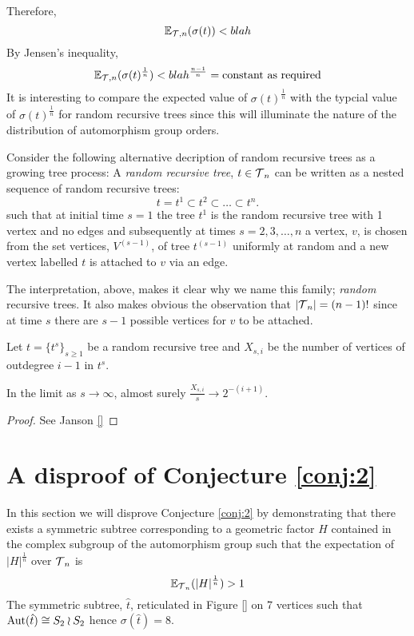 Therefore,
\[
 \mathbb{E}_{\operatorname{\mathcal{T}},n}(\sigma(t)) < blah 
\]
By Jensen's inequality,  %
\[
 \mathbb{E}_{\operatorname{\mathcal{T}},n}(\sigma(t)^{\frac{1}{n}}) < blah^{\frac{n-1}{n}} = \text{constant as required}
\]
It is interesting to compare the expected value of $\sigma(t)^{\frac{1}{n}}$ with the typcial value of $\sigma(t)^{\frac{1}{n}}$ 
for random recursive trees since this will illuminate the nature of the distribution of automorphism group orders.  
 
Consider the following alternative decription of random recursive trees as a growing tree process:  A \emph{random recursive 
tree}, $ t \in \operatorname{\mathcal{T}}_n$ can be written as a nested sequence of random recursive trees:
\[t = t^1 \subset t^2 \subset \dots \subset t^n.\]
such that at initial time $s=1$ the tree $t^1$ is the random recursive tree with 1 vertex and no edges and subsequently at times 
$s = 2,3,\dots,n$ a vertex, $v$, is chosen from the set vertices, $V^{(s-1)}$, of tree $t^{(s-1)}$ uniformly at random and a 
new vertex labelled $t$ is attached to $v$ via an edge.  
\begin{remk}
 The interpretation, above, makes it clear why we name this family; \emph{random} recursive trees.  It also makes obvious the 
 observation that $\lvert \operatorname{\mathcal{T}}_n \rvert  = (n-1)!$ since at time $s$ there are $s-1$ possible vertices for $v$ to be attached.  
\end{remk}
Let $t = \{t^s\}_{s\geq 1}$ be a random recursive tree and $X_{s,i}$ be the number of vertices of outdegree $i-1$ in $t^s$.
 
\begin{thm}
 In the limit as $s \rightarrow \infty$, almost surely $\frac{X_{s,i}}{s} \rightarrow 2^{-(i+1)}$. 
\end{thm}
\begin{proof}
 See Janson \ref{}
\end{proof}
\section{A disproof of Conjecture \ref{conj:2}}\label{sec:disproof}

In this section we will disprove Conjecture \ref{conj:2} by demonstrating that there exists a symmetric subtree corresponding to a geometric factor $H$  contained in the complex subgroup of the automorphism group such that the expectation of $\lvert H \rvert^{\frac{1}{n}}$ over $\operatorname{\mathcal{T}}_n$ is
  \[
   \mathbb{E}_{\operatorname{\mathcal{T}}_n}(\lvert H \rvert^{\frac{1}{n}}) >1
  \]
The symmetric subtree, $\hat{t}$, reticulated in Figure \ref{} on 7 vertices such that $\operatorname{Aut}(\hat{t}) \cong S_2 \wr S_2$ hence $\sigma(\hat{t}) = 8$.

